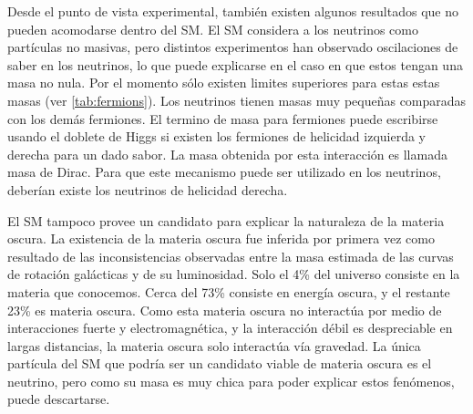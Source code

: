 Desde el punto de vista experimental, también existen algunos resultados que no
pueden acomodarse dentro del SM. El SM considera a los neutrinos como partículas
no masivas, pero distintos
experimentos\cite{PhysRevLett.101.111301,PhysRevD.78.032002} han observado
oscilaciones de saber en los neutrinos, lo que puede explicarse en el caso en
que estos tengan una masa no nula. Por el momento sólo existen limites
superiores para estas estas masas (ver \cref{tab:fermions}). Los neutrinos
tienen masas muy peque\~nas comparadas con los demás fermiones. El termino de
masa para fermiones puede escribirse usando el doblete de Higgs si existen los
fermiones de helicidad izquierda y derecha para un dado sabor. La masa obtenida
por esta interacción es llamada masa de Dirac. Para que este mecanismo puede ser
utilizado en los neutrinos, deberían existe los neutrinos de helicidad derecha.

El SM tampoco provee un candidato para explicar la naturaleza de la materia
oscura. La existencia de la materia oscura fue inferida por primera vez como
resultado de las inconsistencias observadas entre la masa estimada de las curvas
de rotación galácticas y de su luminosidad\cite{DM1}.
Solo el 4\% del universo consiste en la materia que
conocemos\cite{DM2}. Cerca del 73\% consiste en energía oscura, y el restante
23\% es materia oscura. Como esta materia oscura no interactúa por medio de
interacciones fuerte y electromagnética, y la interacción débil es despreciable
en largas distancias, la materia oscura solo interactúa vía gravedad. La única
partícula del SM que podría ser un candidato viable de materia oscura es el
neutrino, pero como su masa es muy chica para poder explicar estos fenómenos,
puede descartarse.


